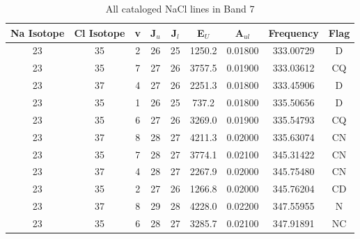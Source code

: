 \begin{table*}[htp]
\centering
\caption{All cataloged NaCl lines in Band 7}
\begin{tabular}{ccccccccc}
\label{tab:Na_detections_B7}
Na Isotope & Cl Isotope & v & J$_u$ & J$_l$ & E$_U$ & A$_{ul}$ & Frequency & Flag \\
\hline
23 & 35 & 2 & 26 & 25 & 1250.2 & 0.01800 & 333.00729 & D \\
23 & 35 & 7 & 27 & 26 & 3757.5 & 0.01900 & 333.03612 & CQ \\
23 & 37 & 4 & 27 & 26 & 2251.3 & 0.01800 & 333.45906 & D \\
23 & 35 & 1 & 26 & 25 & 737.2 & 0.01800 & 335.50656 & D \\
23 & 35 & 6 & 27 & 26 & 3269.0 & 0.01900 & 335.54793 & CQ \\
23 & 37 & 8 & 28 & 27 & 4211.3 & 0.02000 & 335.63074 & CN \\
23 & 35 & 7 & 28 & 27 & 3774.1 & 0.02100 & 345.31422 & CN \\
23 & 37 & 4 & 28 & 27 & 2267.9 & 0.02000 & 345.75480 & CN \\
23 & 35 & 2 & 27 & 26 & 1266.8 & 0.02000 & 345.76204 & CD \\
23 & 37 & 8 & 29 & 28 & 4228.0 & 0.02200 & 347.55955 & N \\
23 & 35 & 6 & 28 & 27 & 3285.7 & 0.02100 & 347.91891 & NC \\
\hline
\end{tabular}

\par 
\end{table*}
